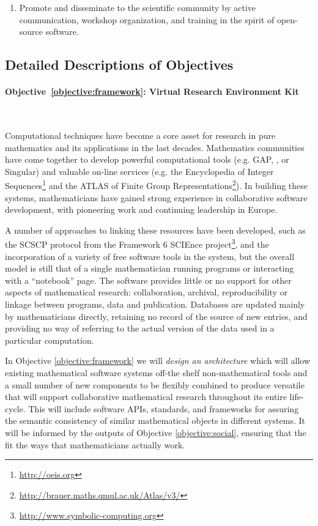 \documentclass[noworkareas,deliverables,\classoptions]{euproposal}       %
\begin{document}
\begin{proposal}
\begin{enumerate}
\item \label{objective:disseminate} Promote and disseminate
  \TheProject to the scientific community by active communication,
  workshop organization, and training in the spirit of open-source
  software.


\end{enumerate}

\subsection*{Detailed Descriptions of Objectives} %

\paragraph{Objective~\ref{objective:framework}: Virtual Research
  Environment Kit}\ 

Computational techniques have become a core asset for research in pure
mathematics and its applications in the last decades. Mathematics
communities have come together to develop powerful computational
tools (e.g. GAP, \PariGP, \Sage or Singular) and valuable on-line
services (e.g. the Encyclopedia of Integer Sequences\footnote{\url{http://oeis.org}} and the ATLAS of Finite Group Representations\footnote{
\url{http://brauer.maths.qmul.ac.uk/Atlas/v3/}}). In building these
systems, mathematicians have gained strong experience in collaborative
software development, with pioneering work and continuing leadership
in Europe.

A number of approaches to linking these resources have been developed,
such as the SCSCP protocol from the Framework 6 SCIEnce
project\footnote{\url{http://www.symbolic-computing.org}}, and the
incorporation of a variety of free software tools in the \Sage system,
but the overall model is still that of a single mathematician running
programs or interacting with a ``notebook'' page. The software
provides little or no support for other aspects of mathematical
research: collaboration, archival, reproducibility or linkage between
programs, data and publication. Databases are updated mainly by
mathematicians directly, retaining no record of the source of new
entries, and providing no way of referring to the actual version of
the data used in a particular computation.

In Objective \ref{objective:framework} we will \emph{design an
  architecture} which will allow existing mathematical software
systems off-the shelf non-mathematical tools and a small number of new
components to be flexibly combined to produce versatile \VREs that will support
collaborative mathematical research throughout its entire
life-cycle. This will include software APIs, standards, and
frameworks for assuring the semantic consistency of similar
mathematical objects in different systems. It will be informed by the
outputs of Objective \ref{objective:social}, ensuring that the \VREs
fit the ways that mathematicians actually work.


\end{proposal}
\end{document}
